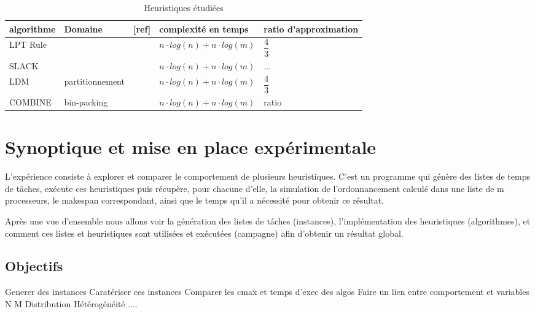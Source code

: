 \documentclass[a4paper,12pt]{report}
\theoremstyle{plain}				%
\theoremstyle{definition}				%
\begin{document}
\begin{table}[h] %
\centering
\begin{tabular}{p{3cm} p{3cm} p{1cm} p{4cm} p{4cm}}
\hline
algorithme 	& Domaine 
			& [ref] 
			& complexité en temps 
			& ratio d'approximation\\
\hline

LPT Rule 	&  
			& \cite{graham1966bounds} 
			& $n \cdot log(n) + n \cdot log(m)$ 
			& $\dfrac{4}{3}$ \\

SLACK   	& 
			& \cite{della2020longest} 
			&$n \cdot log(n) + n \cdot log(m)$ 
			& $\ldots$ \\

LDM   		&  partitionnement 
			& \cite{karmarkar1982differencing} 
			& $n \cdot log(n) + n \cdot log(m)$ 
			& $\dfrac{4}{3}$ \\

COMBINE 	& bin-packing 
			& \cite{lee1988multiprocessor} 
			& $n \cdot log(n) + n \cdot log(m)$ 
			& ratio \\
\hline
\end{tabular}
\caption{Heuristiques étudiées}
\label{table:Heuritiques}
\end{table}


\section{Synoptique et mise en place expérimentale}\label{sec:Synoptique}
L’expérience consiste à explorer et comparer le comportement de plusieurs heuristiques. 
C'est un programme qui génère des listes de temps de tâches, 
  exécute ces heuristiques puis récupère, pour chacune d'elle, 
  la simulation de l’ordonnancement calculé dans une liste de m processeurs, 
  le makespan correspondant, ainsi que le temps qu'il a nécessité pour obtenir ce résultat.

Après une vue d'ensemble nous allons voir la génération des listes de tâches (instances), l'implémentation des heuristiques (algorithmes), et comment ces listes et heuristiques sont utilisées et exécutées (campagne) afin d'obtenir un résultat global.

\subsection{Objectifs}\label{ssec:Objectifs}
Generer des instances
Caratériser ces instances
Comparer les cmax et temps d'exec des algos
Faire un lien entre comportement et variables
 N
 M
 Distribution
 Hétérogénéité
 ....
 
\end{document}

